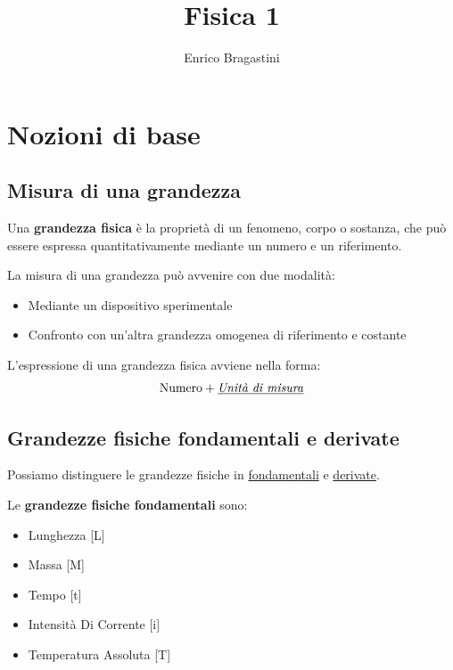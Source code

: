 \documentclass[12pt,oneside]{book}
\title{\Large{\textbf{Fisica 1}}}
\author{Enrico Bragastini}
\begin{document}
\pagestyle{fancy}
\fancyhf{}
\rhead{}
\lhead{\nouppercase\leftmark}
\cfoot{\thepage}
\frontmatter

\maketitle
\tableofcontents

\mainmatter
\chapter{Nozioni di base}
\section{Misura di una grandezza}
Una \textbf{grandezza fisica} è la proprietà di un fenomeno, corpo o sostanza, che può essere espressa
quantitativamente mediante un numero e un riferimento.

\noindent La misura di una grandezza può avvenire con due modalità:
\begin{itemize}
    \item Mediante un dispositivo sperimentale
    \item Confronto con un'altra grandezza omogenea di riferimento e costante
\end{itemize}

\noindent L'espressione di una grandezza fisica avviene nella forma:
\begin{equation*}
    \text{Numero} + \text{\underline{\emph{Unità di misura}}}
\end{equation*}

\section{Grandezze fisiche fondamentali e derivate}
Possiamo distinguere le grandezze fisiche in \underline{fondamentali} e \underline{derivate}.

\noindent Le \textbf{grandezze fisiche fondamentali} sono:
\begin{itemize}
    \item Lunghezza                 \tabto{7cm} [L]
    \item Massa                     \tabto{7cm}  [M]
    \item Tempo                     \tabto{7cm}  [t]
    \item Intensità Di Corrente     \tabto{7cm}  [i]
    \item Temperatura Assoluta      \tabto{7cm}  [T]
\end{itemize}
\end{document}
